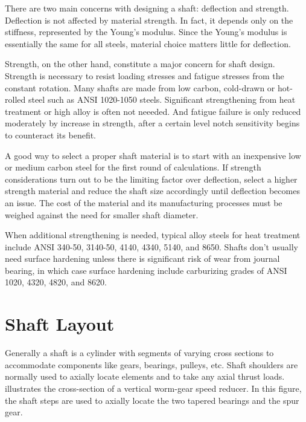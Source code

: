 \documentclass[
10pt,
a4paper,
openany,
svgnames,
]{book}
\begin{document}
There are two main concerns with designing a shaft: deflection and strength. Deflection is not affected by material strength. In fact, it depends only on the stiffness, represented by the Young's modulus. Since the Young's modulus is essentially the same for all steels, material choice matters little for deflection.

Strength, on the other hand, constitute a major concern for shaft design. Strength is necessary to resist loading stresses and fatigue stresses from the constant rotation. Many shafts are made from low carbon, cold-drawn or hot-rolled steel such as ANSI 1020-1050 steels. Significant strengthening from heat treatment or high alloy is often not neeeded. And fatigue failure is only reduced moderately by increase in strength, after a certain level notch sensitivity begins to counteract its benefit.

A good way to select a proper shaft material is to start with an inexpensive low or medium carbon steel for the first round of calculations. If strength considerations turn out to be the limiting factor over deflection, select a higher strength material and reduce the shaft size accordingly until deflection becomes an issue. The cost of the material and its manufacturing processes must be weighed against the need for smaller shaft diameter.

When additional strengthening is needed, typical alloy steels for heat treatment include ANSI 340-50, 3140-50, 4140, 4340, 5140, and 8650. Shafts don't usually need surface hardening unless there is significant risk of wear from journal bearing, in which case surface hardening include carburizing grades of ANSI 1020, 4320, 4820, and 8620. \cite{shigley2011shigley}

\section{Shaft Layout}

Generally a shaft is a cylinder with segments of varying cross sections to accommodate components like gears, bearings, pulleys, etc. Shaft shoulders are normally used to axially locate elements and to take any axial thrust loads.  illustrates the cross-section of a vertical worm-gear speed reducer. In this figure, the shaft steps are used to axially locate the two tapered bearings and the spur gear.
\end{document}

